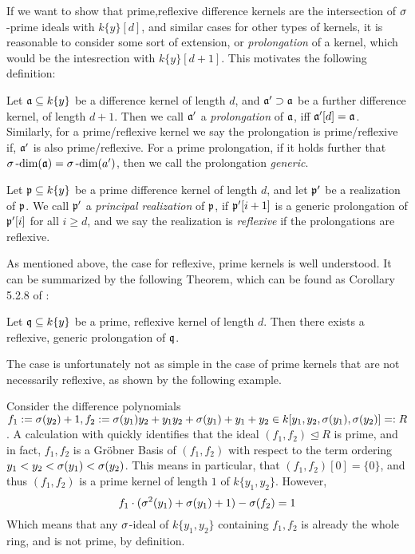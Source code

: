If we want to show that prime,reflexive difference kernels are the intersection of $\sigma$-prime ideals with $k\{y\}[d]$, and similar cases for other types of kernels,
it is reasonable to consider some sort of extension, or \emph{prolongation} of a kernel, which would be the intesrection with $k\{y\}[d+1]$.  
This motivates the following definition: 

\begin{defn}
Let $\mathfrak{a} \subseteq k\{y\}$ be a difference kernel of length $d$, and $\mathfrak{a}' \supset \mathfrak{a}$ be a further difference kernel, of length $d+1$.
Then we call $\mathfrak{a}'$ a \emph{prolongation} of $\mathfrak{a}$, iff $\mathfrak{a}'[d] = \mathfrak{a}$. Similarly, for a prime/reflexive kernel we say the prolongation is prime/reflexive if, $\mathfrak{a}'$ is also prime/reflexive.
For a prime prolongation, if it holds further that $\sigma\operatorname{-dim}(\mathfrak{a}) = \sigma\operatorname{-dim}(a')$, then we call the prolongation \emph{generic}.
\end{defn}

\begin{defn}
Let $\mathfrak{p} \subseteq k\{y\}$ be a prime difference kernel of length $d$, and let $\mathfrak{p}'$ be a realization of $\mathfrak{p}$. We call $\mathfrak{p}'$ a \emph{principal realization} of $\mathfrak{p}$, if $\mathfrak{p}'[i+1]$ is a generic prolongation of $\mathfrak{p}'[i]$ for all $i \geq d$,
and we say the realization is \emph{reflexive} if the prolongations are reflexive.  
\end{defn}

As mentioned above, the case for reflexive, prime kernels is well understood. It can be summarized by the following Theorem, which can be found as Corollary 5.2.8 of \cite{wibmer}:
\begin{theorem}
Let $\mathfrak{q} \subseteq k\{y\}$ be a prime, reflexive kernel of length $d$. Then there exists a reflexive, generic prolongation of $\mathfrak{q}$. 
\end{theorem}

The case is unfortunately not as simple in the case of prime kernels that are not necessarily reflexive, as shown by the following example.

\begin{ex}
Consider the difference polynomials $f_1 := \sigma(y_2) + 1, f_2:= \sigma(y_1)y_2 + y_1y_2 + \sigma(y_1) + y_1 + y_2 \in k[y_1,y_2,\sigma(y_1),\sigma(y_2)] =: R$.
A calculation with \cite{M2} quickly identifies that the ideal $(f_1,f_2) \unlhd R$ is prime, and in fact, $f_1,f_2$ is a Gr\"{o}bner Basis of $(f_1,f_2)$ with respect to the
term ordering $y_1 < y_2 < \sigma(y_1) < \sigma(y_2)$. This means in particular, that $(f_1,f_2)[0] = \{0\}$, and thus $(f_1,f_2)$ is a prime kernel of length $1$ of $k\{y_1,y_2\}$. However,
\[ f_1 \cdot (\sigma^2(y_1) + \sigma(y_1) + 1 ) - \sigma(f_2) = 1 \]
Which means that any $\sigma$-ideal of $k\{y_1,y_2\}$ containing $f_1, f_2$ is already the whole ring, and is not prime, by definition.
\end{ex}

